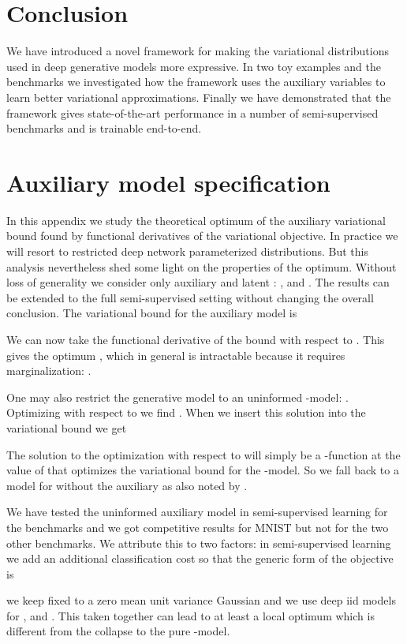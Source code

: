 \documentclass{article}
\begin{document}
\section{Conclusion}
We have introduced a novel framework for making the variational distributions used in deep generative models more expressive. In two toy examples and the benchmarks we investigated how the framework uses the auxiliary variables to learn better variational approximations. Finally we have demonstrated that the framework gives state-of-the-art performance in a number of semi-supervised benchmarks and is trainable end-to-end. 

\appendix 
\section{Auxiliary model specification} \label{app:auxiliary_variable}

In this appendix we study the theoretical optimum of the auxiliary variational bound found by functional derivatives of the variational objective. In practice we will resort to restricted deep network parameterized distributions. But this analysis nevertheless shed some light on the properties of the optimum. Without loss of generality we consider only auxiliary  and latent : ,  and . The results can be extended to the full semi-supervised setting without changing the overall conclusion. The variational bound for the auxiliary model is

We can now take the functional derivative of the bound with respect to . This gives the optimum , which in general is intractable because it requires marginalization: . 

One may also restrict the generative model to an uninformed -model: . Optimizing with respect to  we find . When we insert this solution into the variational bound we get

The solution to the optimization with respect to  will simply be a -function at the value of  that optimizes the variational bound for the -model. So we fall back to a model for  without the auxiliary as also noted by \citet{Agakov04}. 

We have tested the uninformed auxiliary model in semi-supervised learning for the benchmarks and we got competitive results for MNIST but not for the two other benchmarks. We attribute this to two factors: in semi-supervised learning we add an additional classification cost so that the generic form of the objective is 

we keep  fixed to a zero mean unit variance Gaussian and we use deep iid models for ,  and . This taken together can lead to at least a local optimum which is different from the collapse to the pure -model. 
\end{document}
